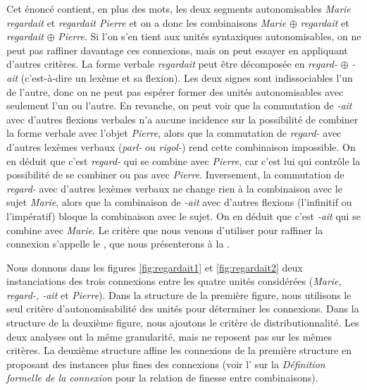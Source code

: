 Cet énoncé contient, en plus des mots, les deux segments autonomisables \textit{Marie regardait} et \textit{regardait Pierre} et on a donc les combinaisons \textit{Marie} ${\oplus}$ \textit{regardait} et \textit{regardait} ${\oplus}$ \textit{Pierre}. Si l’on s’en tient aux unités syntaxiques autonomisables, on ne peut pas raffiner davantage ces connexions, mais on peut essayer en appliquant d’autres critères. La forme verbale \textit{regardait} peut être décomposée en \textit{regard-} ${\oplus}$ \textit{{}-ait} (c’est-à-dire un lexème et sa flexion). Les deux signes sont indissociables l’un de l’autre, donc on ne peut pas espérer former des unités autonomisables avec seulement l’un ou l’autre. En revanche, on peut voir que la commutation de \textit{{}-ait} avec d’autres flexions verbales n’a aucune incidence sur la possibilité de combiner la forme verbale avec l’objet \textit{Pierre}, alors que la commutation de \textit{regard-} avec d’autres lexèmes verbaux (\textit{parl-} ou \textit{rigol-}) rend cette combinaison impossible. On en déduit que c’est \textit{regard-} qui se combine avec \textit{Pierre}, car c’est lui qui contrôle la possibilité de se combiner ou pas avec \textit{Pierre}. Inversement, la commutation de \textit{regard-} avec d’autres lexèmes verbaux ne change rien à la combinaison avec le sujet \textit{Marie}, alors que la combinaison de \textit{{}-ait} avec d’autres flexions (l’infinitif ou l’impératif) bloque la combinaison avec le sujet. On en déduit que c’est \textit{{}-ait} qui se combine avec \textit{Marie}. Le critère que nous venons d’utiliser pour raffiner la connexion s’appelle le , que nous présenterons à la .

\begin{sloppypar}
Nous donnons dans les figures \ref{fig:regardait1} et \ref{fig:regardait2} deux instanciations des trois connexions entre les quatre unités considérées (\textit{Marie, regard-, -ait} et \textit{Pierre}). Dans la structure de la première figure, nous utilisons le seul critère d’autonomisabilité des unités pour déterminer les connexions. Dans la structure de la deuxième figure, nous ajoutons le critère de distributionnalité. Les deux analyses ont la même granularité, mais ne reposent pas sur les mêmes critères. La deuxième structure affine les connexions de la première structure en proposant des instances plus fines des connexions (voir l’ sur la \textit{Définition formelle de la connexion} pour la relation de finesse entre combinaisons).
\end{sloppypar}

